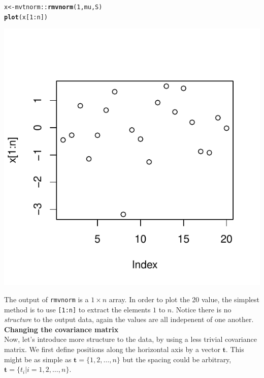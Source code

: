 \documentclass[a4paper,11pt]{article}\usepackage[]{graphicx}\usepackage[]{color}
\makeatletter
\def\maxwidth{ %
  \ifdim\Gin@nat@width>\linewidth
    \linewidth
  \else
    \Gin@nat@width
  \fi
}
\newcommand{\hlnum}[1]{\textcolor[rgb]{0.686,0.059,0.569}{#1}}%
\newcommand{\hlopt}[1]{\textcolor[rgb]{0,0,0}{#1}}%
\newcommand{\hlstd}[1]{\textcolor[rgb]{0.345,0.345,0.345}{#1}}%
\newcommand{\hlkwb}[1]{\textcolor[rgb]{0.69,0.353,0.396}{#1}}%
\newcommand{\hlkwd}[1]{\textcolor[rgb]{0.737,0.353,0.396}{\textbf{#1}}}%
\newenvironment{kframe}{%
 \def\at@end@of@kframe{}%
 \ifinner\ifhmode%
  \def\at@end@of@kframe{\end{minipage}}%
  \begin{minipage}{\columnwidth}%
 \fi\fi%
 \def\FrameCommand##1{\hskip\@totalleftmargin \hskip-\fboxsep
 \colorbox{shadecolor}{##1}\hskip-\fboxsep
     \hskip-\linewidth \hskip-\@totalleftmargin \hskip\columnwidth}%
 \MakeFramed {\advance\hsize-\width
   \@totalleftmargin\z@ \linewidth\hsize
   \@setminipage}}%
 {\par\unskip\endMakeFramed%
 \at@end@of@kframe}
\newenvironment{knitrout}{}{} %
\makeatother
\begin{document}
\begin{knitrout}
\color{fgcolor}\begin{kframe}
\begin{alltt}
  \hlstd{x} \hlkwb{<-} \hlstd{mvtnorm}\hlopt{::}\hlkwd{rmvnorm}\hlstd{(}\hlnum{1}\hlstd{, mu, S)}
  \hlkwd{plot}\hlstd{(x[}\hlnum{1}\hlopt{:}\hlstd{n])}
\end{alltt}
\end{kframe}

{\centering \includegraphics[width=\maxwidth]{figure/unnamed-chunk-7-1} 

}



\end{knitrout}

The output of {\tt rmvnorm} is a $1 \times n$ array. In order to plot the 20 value, the simplest method is to use {\tt [1:n]} to extract the elements $1$ to $n$. Notice there is no \emph{structure} to the output data, again the values are all indepenent of one another.\\

\textbf{Changing the covariance matrix}\\

Now, let's introduce more structure to the data, by using a less trivial covariance matrix. We first define positions along the horizontal axis by a vector $\mathbf{t}$. This might be as simple as $\mathbf{t} = \{1, 2, \ldots, n\}$ but the spacing could be arbitrary, $\mathbf{t} = \{ t_i | i=1,2,\ldots,n\}$.
\end{document}
